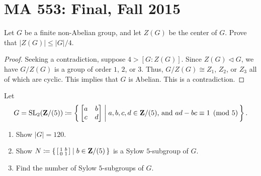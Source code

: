 \chapter{MA 553: Final, Fall 2015}
\begin{problem}
Let $G$ be a finite non-Abelian group, and let $Z(G)$ be the center of
$G$. Prove that $|Z(G)|\leq |G|/4$.
\end{problem}
\begin{proof}
Seeking a contradiction, suppose $4>[G:Z(G)]$. Since $Z(G)\lhd G$, we have
$G/Z(G)$ is a group of order $1$, $2$, or $3$. Thus, $G/Z(G)\cong Z_1$,
$Z_2$, or $Z_3$ all of which are cyclic. This implies that $G$ is
Abelian. This is a contradiction.
\end{proof}

\begin{problem}
Let
\[
G=\operatorname{SL}_2(\mathbf{Z}/(5))\coloneqq
\left\{\,\begin{bmatrix}a&b\\c&d\end{bmatrix}\;\middle|\;
\text{$a,b,c,d\in\mathbf{Z}/(5)$, and $ad-bc\equiv 1\pmod{5}$}\,\right\}.
\]
\begin{enumerate}[label=(\alph*)]
\item Show $|G|=120$.
\item Show
  $N\coloneqq\left\{\,\left[\begin{smallmatrix}1&b\\0&1\end{smallmatrix}\right]\;\middle|\;b\in\mathbf{Z}/(5)\,\right\}$
  is a Sylow $5$-subgroup of $G$.
\item Find the number of Sylow $5$-subgroups of $G$.
\end{enumerate}
\end{problem}
